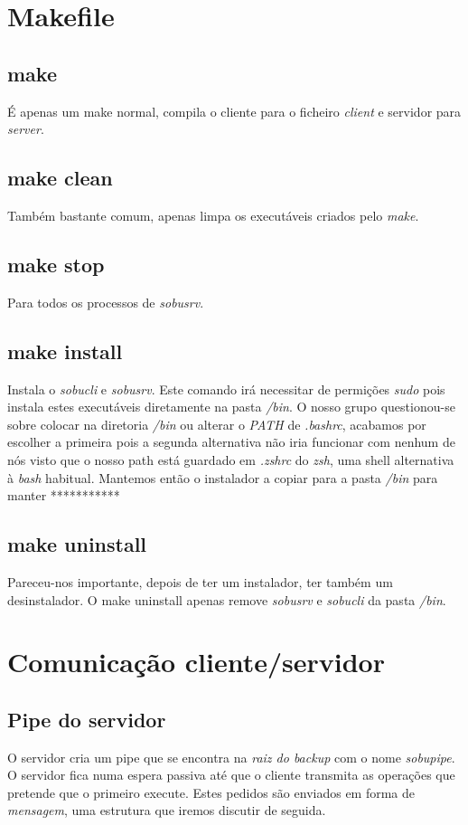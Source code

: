 \documentclass[12pt,a4paper]{report}
\begin{document}
\chapter{Makefile}
\section{make}
É apenas um make normal, compila o cliente para o ficheiro \emph{client} e servidor para \emph{server}.

\section{make clean}
Também bastante comum, apenas limpa os executáveis criados pelo \emph{make}.

\section{make stop}
Para todos os processos de \emph{sobusrv}.

\section{make install}
Instala o \emph{sobucli} e \emph{sobusrv}. Este comando irá necessitar de permições \emph{sudo} pois instala estes executáveis diretamente na pasta \emph{/bin}. O nosso grupo questionou-se sobre colocar na diretoria \emph{/bin} ou alterar o \emph{PATH} de \emph{.bashrc}, acabamos por escolher a primeira pois a segunda alternativa não iria funcionar com nenhum de nós visto que o nosso path está guardado em \emph{.zshrc} do \emph{zsh}, uma shell alternativa à \emph{bash} habitual. Mantemos então o instalador a copiar para a pasta \emph{/bin} para manter ***********

\section{make uninstall}
Pareceu-nos importante, depois de ter um instalador, ter também um desinstalador. O make uninstall apenas remove \emph{sobusrv} e \emph{sobucli} da pasta \emph{/bin}.

\chapter{Comunicação cliente/servidor}

\section{Pipe do servidor}
O servidor cria um pipe que se encontra na \emph{raiz do backup} com o nome \emph{sobupipe}. O servidor fica numa espera passiva até que o cliente transmita as operações que pretende que o primeiro execute. Estes pedidos são enviados em forma de \emph{mensagem}, uma estrutura que iremos discutir de seguida.
\end{document}
